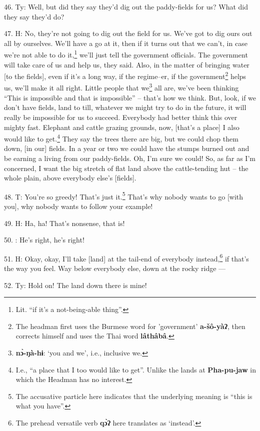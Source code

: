46. Ty: Well, but did they say they'd dig out the paddy-fields for us? What
did they say they'd do?

47. H: No, they're not going to dig out the field for us. We've got to dig ours
out all by ourselves. We'll have a go at it, then if it turns out that we can't,
in case we're not able to do it,\footnote{Lit. ``if it's a not-being-able thing''.} we'll just tell the government officials.
The government will take care of us and help us, they said. Also, in the matter
of bringing water [to the fields], even if it's a long way, if the regime--er,
if the government\footnote{The headman first uses the Burmese word for 'government' \textbf{a-šô-yàʔ}, then corrects himself and uses the Thai word \textbf{lâthâbâ}.} helps us, we'll make it all right. Little people that we\footnote{\textbf{nɔ̀-ŋà-hɨ}: `you and we', i.e., inclusive we.}
all are, we've been thinking ``This is impossible and that is impossible''
-- that's how we think. But, look, if we don't have fields, land to till, whatever
we might try to do in the future, it will really be impossible for us to succeed.
Everybody had better think this over mighty fast. Elephant and cattle grazing grounds,
now, [that's a place] I also would like to get.\footnote{I.e., ``a place that I too would like to get''. Unlike the lands at \textbf{Pha-pu-jaw} in which the Headman has no interest.} They say the trees there are
big, but we could chop them down, [in our] fields. In a year or two we could have
the stumps burned out and be earning a living from our paddy-fields. Oh, I'm sure
we could! So, as far as I'm concerned, I want the big stretch of flat land above
the cattle-tending hut -- the whole plain, above everybody else's [fields].

48. T: You're so greedy! That's just it.\footnote{The accusative particle here indicates that the underlying meaning is ``this is what you have''.} That's why nobody wants to go
[with you], why nobody wants to follow your example!

49. H: Ha, ha! That's nonsense, that is!

50. : He's right, he's right!

51. H: Okay, okay, I'll take [land] at the tail-end of everybody instead,\footnote{The prehead versatile verb \textbf{qɔ̀ʔ} here translates as `instead'.} if
that's the way you feel. Way below everybody else, down at the rocky ridge ---


52. Ty: Hold on! The land down there is mine!

